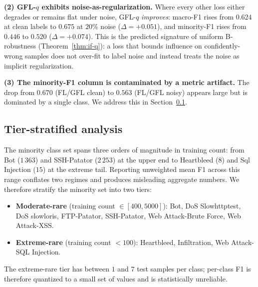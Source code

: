 \documentclass[conference]{IEEEtran}
\theoremstyle{definition}
\begin{document}
\textbf{(2) GFL-$q$ exhibits noise-as-regularization.} Where every other loss either degrades or remains flat under noise, GFL-$q$ \emph{improves}: macro-F1 rises from $0.624$ at clean labels to $0.675$ at $20\%$ noise ($\Delta = +0.051$), and minority-F1 rises from $0.446$ to $0.520$ ($\Delta = +0.074$). This is the predicted signature of uniform B-robustness (Theorem~\ref{thm:if-q}): a loss that bounds influence on confidently-wrong samples does not over-fit to label noise and instead treats the noise as implicit regularization.

\textbf{(3) The minority-F1 column is contaminated by a metric artifact.} The drop from $0.670$ (FL/GFL clean) to $0.563$ (FL/GFL noisy) appears large but is dominated by a single class. We address this in Section~\ref{sec:exp-f1-tier}.

\subsection{Tier-stratified analysis}
\label{sec:exp-f1-tier}

The minority class set spans three orders of magnitude in training count: from Bot ($1\,363$) and SSH-Patator ($2\,253$) at the upper end to Heartbleed ($8$) and Sql Injection ($15$) at the extreme tail. Reporting unweighted mean F1 across this range conflates two regimes and produces misleading aggregate numbers. We therefore stratify the minority set into two tiers:
\begin{itemize}[leftmargin=1.6em]
\item \textbf{Moderate-rare} (training count $\in [400, 5000]$): Bot, DoS Slowhttptest, DoS slowloris, FTP-Patator, SSH-Patator, Web Attack-Brute Force, Web Attack-XSS.
\item \textbf{Extreme-rare} (training count $< 100$): Heartbleed, Infiltration, Web Attack-SQL Injection.
\end{itemize}
The extreme-rare tier has between $1$ and $7$ test samples per class; per-class F1 is therefore quantized to a small set of values and is statistically unreliable.
\end{document}
